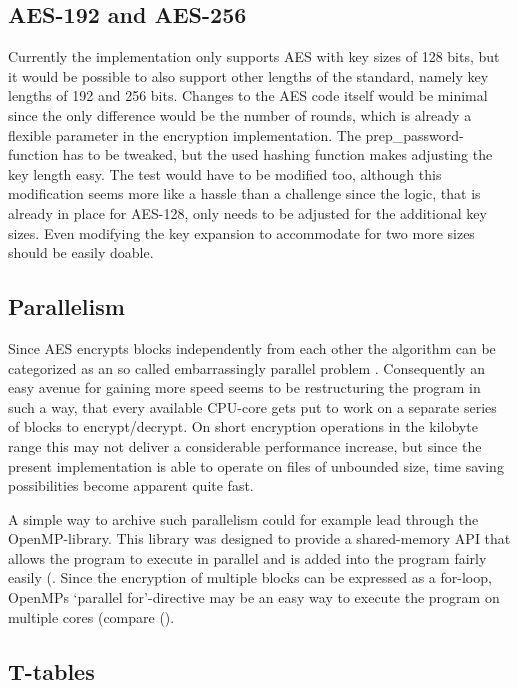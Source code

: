\hypertarget{aes-192-and-aes-256}{%
\subsection{AES-192 and AES-256}\label{aes-192-and-aes-256}}

Currently the implementation only supports AES with key sizes of 128
bits, but it would be possible to also support other lengths of the
standard, namely key lengths of 192 and 256 bits. Changes to the AES
code itself would be minimal since the only difference would be the
number of rounds, which is already a flexible parameter in the
encryption implementation. The prep\_password-function has to be
tweaked, but the used hashing function makes adjusting the key length
easy. The test would have to be modified too, although this modification
seems more like a hassle than a challenge since the logic, that is
already in place for AES-128, only needs to be adjusted for the
additional key sizes. Even modifying the key expansion to accommodate
for two more sizes should be easily doable.

\hypertarget{parallelism}{%
\subsection{Parallelism}\label{parallelism}}

Since AES encrypts blocks independently from each other the algorithm
can be categorized as an so called embarrassingly parallel problem
\cite[p.48]{parallelprog}. Consequently an easy avenue for gaining more
speed seems to be restructuring the program in such a way, that every
available CPU-core gets put to work on a separate series of blocks to
encrypt/decrypt. On short encryption operations in the kilobyte range
this may not deliver a considerable performance increase, but since the
present implementation is able to operate on files of unbounded size,
time saving possibilities become apparent quite fast.

A simple way to archive such parallelism could for example lead through
the OpenMP-library. This library was designed to provide a shared-memory
API that allows the program to execute in parallel and is added into the
program fairly easily (\cite[ch. 5]{parallelprog}. Since the encryption of
multiple blocks can be expressed as a for-loop, OpenMPs `parallel
for'-directive may be an easy way to execute the program on multiple
cores (compare (\cite[ch. 5.5]{parallelprog}).

\hypertarget{t-tables}{%
\subsection{T-tables}\label{t-tables}}


